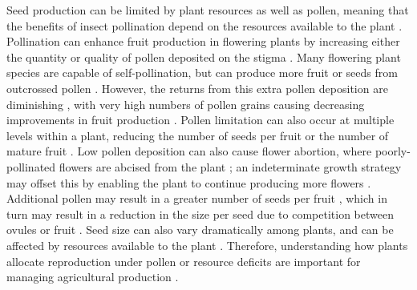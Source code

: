 \documentclass[12pt]{article} %
\begin{document}
Seed production can be limited by plant resources as well as pollen, meaning that the benefits of insect pollination depend on the resources available to the plant \citep{stephenson1981, marini2015, tamburini2017, tamburini2019}.
Pollination can enhance fruit production in flowering plants by increasing either the quantity or quality of pollen deposited on the stigma \citep{stephenson1981, burd1994, aizen2007}.
Many flowering plant species are capable of self-pollination, but can produce more fruit or seeds from outcrossed pollen \citep{knight2005}.
However, the returns from this extra pollen deposition are diminishing \citep{plowright1981}, with very high numbers of pollen grains causing decreasing improvements in fruit production \citep{ashman2004, harder2016}.
Pollen limitation can also occur at multiple levels within a plant, reducing the number of seeds per fruit or the number of mature fruit \citep{burd1994}.
Low pollen deposition can also cause flower abortion, where poorly-pollinated flowers are abcised from the plant \citep{stephenson1981}; an indeterminate growth strategy may offset this by enabling the plant to continue producing more flowers \citep{doust1982, lawrence1993, sabbahi2006, bos2007}.
Additional pollen may result in a greater number of seeds per fruit \citep{knight2006}, which in turn may result in a reduction in the size per seed due to competition between ovules or fruit \citep{free1968, mazer1987}.
Seed size can also vary dramatically among plants, and can be affected by resources available to the plant \citep{mazer1987, venable1992}. 
Therefore, understanding how plants allocate reproduction under pollen or resource deficits are important for managing agricultural production \citep{bos2007, tamburini2019}.
\end{document}
